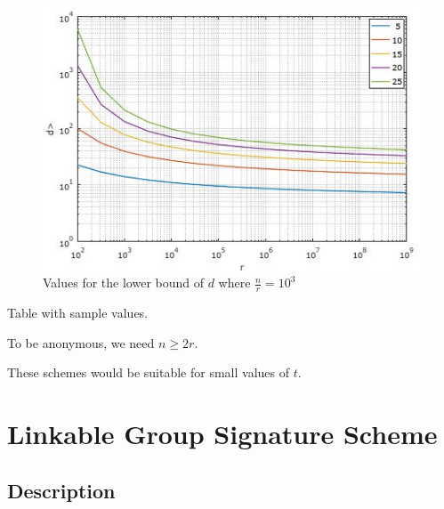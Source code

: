 \begin{figure}[H]
    \begin{center}
        \includegraphics[scale=1.5]{images/phf.jpg}
    \end{center}

    \caption{Values for the lower bound of $d$ where $\frac{n}{r} = 10^3$} 
\end{figure}


Table with sample values.

To be anonymous, we need $n \geq 2r$.

These schemes would be suitable for small values of $t$.



\section{Linkable Group Signature Scheme}
\cite{ChenNW11}
\subsection{Description}
